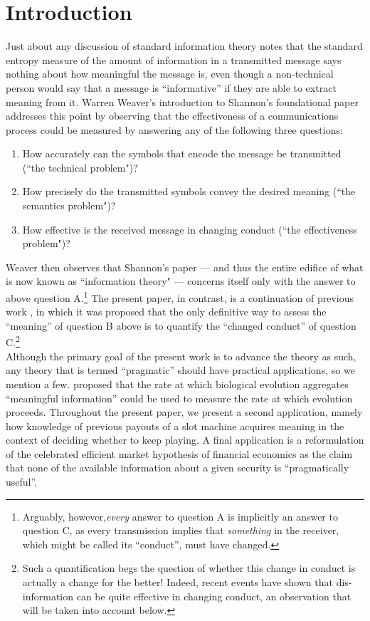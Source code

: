 \documentclass[11pt]{article}
\begin{document}
\section{Introduction}
Just about any discussion of standard information theory notes that the standard entropy measure of the amount of information in a transmitted message says nothing about how meaningful the message is, even 
though a non-technical person would say that a message is ``informative'' if they are able to extract meaning from it.  Warren Weaver's introduction to Shannon’s foundational paper \cite{ShannonAndWeaver62} 
addresses this point by observing that the effectiveness of a communications process could be measured by answering any of the following three questions: \\
\begin{enumerate}
\item[A.] How accurately can the symbols that encode the message be transmitted (``the technical problem")?
\item[B.] How precisely do the transmitted symbols convey the desired meaning (``the semantics problem")?
\item[C.] How effective is the received message in changing conduct (``the effectiveness problem")?\\
\end{enumerate}
Weaver then observes that Shannon's paper --- and thus the entire edifice of what is now known as ``information theory" --- concerns itself only with the answer to above question A.\footnote{Arguably, however,{\it every} answer to question A is implicitly an answer to question C, as  every transmission implies that {\it something} in the receiver, which might be called its “conduct”, must have changed.}  The present paper, in contrast, is a continuation of previous work \cite{Weinberger02}, in which it was proposed that the only definitive way to assess the ``meaning” of question B above is to quantify the “changed conduct” of question C.\footnote{Such a quantification begs the question of whether this change in conduct is actually a change for the better!  Indeed, recent events have shown that dis-information can be quite effective in changing conduct, an observation that will be taken into account below.}\\

Although the primary goal of the present work is to advance the theory as such, any theory that is termed ``pragmatic'' should have practical applications, so we mention a few.  \cite{Weinberger02} proposed that the rate at which biological evolution aggregates ``meaningful information'' could be used to measure the rate at which evolution proceeds.  Throughout the present paper, we present a second application, namely
 how knowledge of previous payouts of a slot machine acquires meaning in the context of deciding whether to keep playing.  A final application is a reformulation of the celebrated efficient market hypothesis of financial economics as the claim that none of the available information about a given security is ``pragmatically useful''.\\
\end{document}
